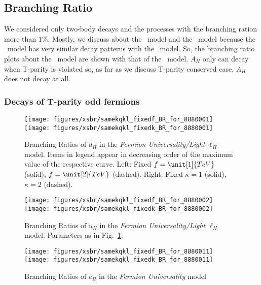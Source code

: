 \subsection{Branching Ratio}
 
We considered only two-body decays and the processes with the branching ration more than $1\%$. 
Mostly, we discuss about the \fu~model and the \lil~model because the \hq~model has very similar decay patterns with the \fu~model.
So, the branching ratio plots about the \hq~model are shown with that of the \fu~model.
$A_H$ only can decay when T-parity is violated 
so, as far as we discuss T-parity conserved case, $A_H$ does not decay at all.

\subsubsection*{Decays of T-parity odd fermions}
\begin{figure*}
\centering
\texttt{[image: figures/xsbr/samekqkl\_fixedf\_BR\_for\_8880001]} \quad
\texttt{[image: figures/xsbr/samekqkl\_fixedk\_BR\_for\_8880001]} \quad
\caption{Branching Ratios of $d_H$ in the \emph{Fermion Universality/Light $\ell_H$} model. 
Items in legend appear in decreasing order of the maximum value of the respective curve. 
Left: Fixed $f = \unit[1]{TeV}$ (solid), $f = \unit[2]{TeV}$ (dashed). Right: Fixed $\kappa = 1$ (solid), $\kappa = 2$ (dashed).}
\label{fig:cm:br1}
\end{figure*}
\begin{figure*}
\centering
\texttt{[image: figures/xsbr/samekqkl\_fixedf\_BR\_for\_8880002]} \quad
\texttt{[image: figures/xsbr/samekqkl\_fixedk\_BR\_for\_8880002]} \quad
\caption{Branching Ratios of $u_H$ in the \emph{Fermion Universality/Light $\ell_H$} model. 
Parameters as in Fig.~\ref{fig:cm:br1}.}
\label{fig:cm:br2}
\end{figure*}


\begin{figure*}
\centering
\texttt{[image: figures/xsbr/samekqkl\_fixedf\_BR\_for\_8880011]} \quad
\texttt{[image: figures/xsbr/samekqkl\_fixedk\_BR\_for\_8880011]} \quad
\caption{Branching Ratios of $e_H$ in the \emph{Fermion Universality} model}
\label{fig:cm:br11}
\end{figure*}

